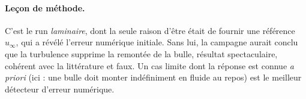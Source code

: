 \paragraph{Leçon de méthode.} C'est le run \emph{laminaire}, dont la seule
raison d'être était de fournir une référence $u_\infty$, qui a révélé
l'erreur numérique initiale. Sans lui, la campagne aurait conclu que \og{}la turbulence supprime la
remontée de la bulle\fg{}, résultat spectaculaire, cohérent avec la littérature
\cite{legendre2025} et faux. Un cas limite dont la réponse est
connue \emph{a priori} (ici : une bulle doit monter indéfiniment en fluide au
repos) est le meilleur détecteur d'erreur numérique.
